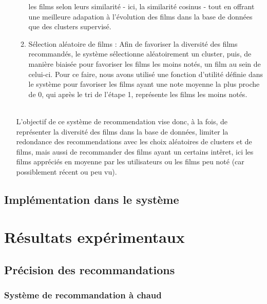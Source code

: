 \documentclass{article}
\begin{document}
\begin{itemize}
\begin{enumerate}
        les films selon leurs similarité - ici, la similarité cosinus - tout en offrant une meilleure adapation à l'évolution des films dans la base de données que des clusters supervisé.
        \item Sélection aléatoire de films : Afin de favoriser la diversité des films recommandés, le système sélectionne aléatoirement un cluster, puis, de manière biaisée pour favoriser les films les moins notés, un film au sein de celui-ci.
        Pour ce faire, nous avons utilisé une fonction d'utilité définie dans le système pour favoriser les films ayant une note moyenne la plus proche de 0, qui après le tri de l'étape 1, représente les films les moins notés.
    \end{enumerate}
    $ $\\
    L'objectif de ce système de recommendation vise donc, à la fois, de représenter la diversité des films dans la base de données, limiter la redondance des recommendations avec les choix aléatoires de clusters et de films, mais aussi de recommander des films 
    ayant un certains intêret, ici les films appréciés en moyenne par les utilisateurs ou les films peu noté (car possiblement récent ou peu vu).\\

\end{itemize}


\subsection{Implémentation dans le système}
    \section{Résultats expérimentaux}
    \subsection{Précision des recommandations}
    \subsubsection{Système de recommandation à chaud}
    $ $\\
    \\
    \\
    \\
    \\
    \\
    \\
    \\
\end{document}
